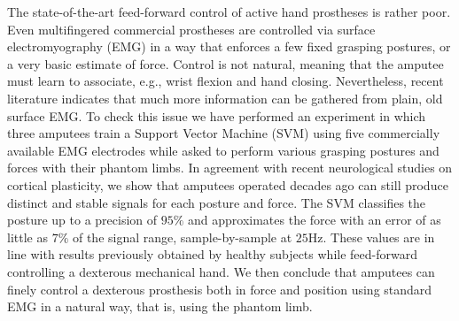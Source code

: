 The state-of-the-art feed-forward control of active hand prostheses
is rather poor. Even multifingered commercial prostheses are
controlled via surface electromyography (EMG) in a way that enforces
a few fixed grasping postures, or a very basic estimate of force.
Control is not natural, meaning that the amputee must learn to associate,
e.g., wrist flexion and hand closing. Nevertheless, recent literature
indicates that much more information can be gathered from plain, old
surface EMG. To check this issue we have performed an experiment in
which three amputees train a Support Vector Machine (SVM) using five
commercially available EMG electrodes while asked to perform various
grasping postures and forces with their phantom limbs. In agreement
with recent neurological studies on cortical plasticity, we show that
amputees operated decades ago can still produce distinct and stable
signals for each posture and force. The SVM classifies the posture up
to a precision of $95\%$ and approximates the force with an error of
as little as $7\%$ of the signal range, sample-by-sample at $25$Hz.
These values are in line with results previously obtained by healthy
subjects while feed-forward controlling a dexterous mechanical hand.
We then conclude that amputees can finely control a dexterous prosthesis
both in force and position using standard EMG in a natural way, that is,
using the phantom limb.
